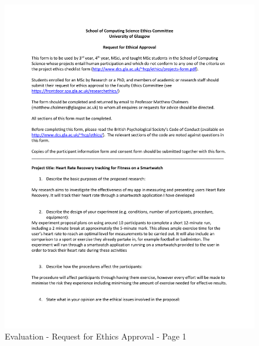\documentclass{l4proj}
\begin{document}
\begin{figure}[h!]
    \centering
    \includegraphics[width=1\linewidth]{dissertation//dissImages/RequestforEthicsApprovalpage1.pdf}
    \caption{Evaluation - Request for Ethics Approval - Page 1}
\end{figure}
\end{document}
